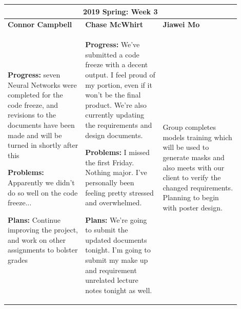 \documentclass[10pt,journal,compsoc, draftclsnofoot,onecolumn]{IEEEtran}
\begin{document}
\begin{center}
\begin{tabular}{|p{0.3\linewidth}|p{0.3\linewidth}|p{0.3\linewidth}|}
\hline
\multicolumn{3}{|c|}{\textbf{2019 Spring: Week 3}} \\
\hline
\textbf{Connor Campbell} & \textbf{Chase McWhirt} & \textbf{Jiawei Mo} \\ [0.5ex]
\hline\hline

\textbf{Progress:} seven Neural Networks were completed for the code freeze, and revisions to the documents have been made and will be turned in shortly after this

\textbf{Problems:} Apparently we didn't do so well on the code freeze...

\textbf{Plans:} Continue improving the project, and work on other assignments to bolster grades
&
\textbf{Progress:} We've submitted a code freeze with a decent output.
I feel proud of my portion, even if it won't be the final product.
We're also currently updating the requirements and design documents.

\textbf{Problems:} I missed the first Friday.
Nothing major.
I've personally been feeling pretty stressed and overwhelmed.

\textbf{Plans:} We're going to submit the updated documents tonight.
I'm going to submit my make up and requirement unrelated lecture notes tonight as well.
&
Group completes models training which will be used to generate masks and also meets with our client to verify the changed requirements. Planning to begin with poster design.
\\ \hline
\end{tabular}
\end{center}
\end{document}
